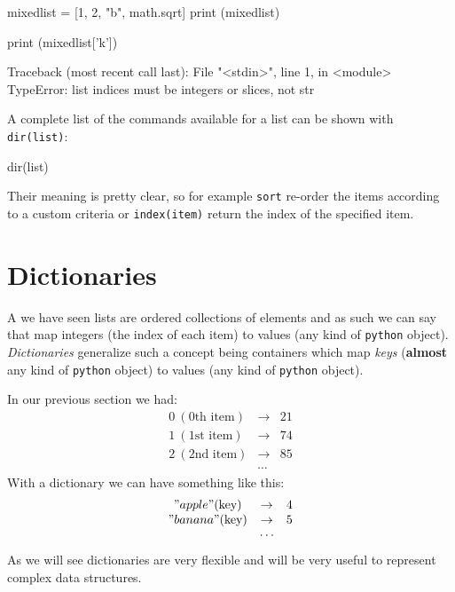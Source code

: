 \begin{ipython}
mixedlist = [1, 2, "b", math.sqrt]
print (mixedlist)
\end{ipython}
\begin{ioutput}
\end{ioutput}

\begin{ipython}
print (mixedlist['k'])
\end{ipython}
\begin{ioutput}
Traceback (most recent call last):
  File "<stdin>", line 1, in <module>
TypeError: list indices must be integers or slices, not str
\end{ioutput}

A complete list of the commands available for a list can be shown with \texttt{dir(list)}:

\begin{ipython}
dir(list)
\end{ipython}
\begin{ioutput}
\end{ioutput}

Their meaning is pretty clear, so for example \texttt{sort} re-order the items according to a custom criteria or \texttt{index(item)} return the index of the specified item.

\section{Dictionaries}\label{dictionaries}

A we have seen lists are ordered collections of elements and as such we can say that map integers (the index of each item) to values (any kind of \texttt{python} object). \emph{Dictionaries} generalize such a concept being containers which map \emph{keys} (\textbf{almost} any kind of \texttt{python} object) to values (any kind of \texttt{python} object).

In our previous section we had:
\[
\begin{matrix} 
0~(\textrm{0th item})& \rightarrow& 21\\
1~(\textrm{1st item})& \rightarrow& 74\\
2~(\textrm{2nd item})& \rightarrow& 85\\ 
&\cdots&  
\end{matrix}
\]
With a dictionary we can have something like this:
\[
\begin{matrix}
"apple" (\textrm{key})&\rightarrow& 4 \\
"banana" (\textrm{key})& \rightarrow& 5 \\
&\cdots&
\end{matrix}
\]
As we will see dictionaries are very flexible and will be very useful to represent complex data structures.

